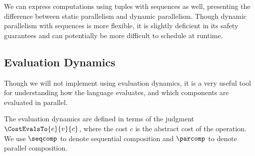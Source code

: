 We can express computations using tuples with sequences as well, presenting the difference between
static parallelism and dynamic parallelism. Though dynamic parallelism with sequences is more flexible,
it is slightly deficient in its safety guarantees and can potentially be more difficult to schedule at runtime.

\subsection{Evaluation Dynamics}

Though we will not implement \LangPPCFv{} using evaluation dynamics, it is a very
useful tool for understanding how the language evaluates, and which components are evaluated
in parallel.

The evaluation dynamics are defined in terms of the judgment $\CostEvalsTo{e}{v}{c}$, where
the cost $c$ is the abstract cost of the operation. We use $\seqcomp$ to
denote sequential composition and $\parcomp$ to denote parallel composition.
